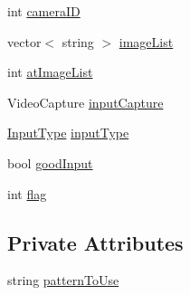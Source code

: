 \begin{DoxyCompactItemize}
\item 
int \hyperlink{classSettings_af32a5ff06192bde106c934e0361bcd7e}{camera\-I\-D}
\item 
vector$<$ string $>$ \hyperlink{classSettings_ae261128a69d1d3d2b0f5315aff8066c8}{image\-List}
\item 
int \hyperlink{classSettings_a80061aedf354e63cb6c4c1fb7c4a9055}{at\-Image\-List}
\item 
Video\-Capture \hyperlink{classSettings_abd5706146b34d3c32aef4025dcd2ec1b}{input\-Capture}
\item 
\hyperlink{classSettings_a5afe85d24b071973a7f248c05386f7f4}{Input\-Type} \hyperlink{classSettings_a89fb14ce9856fb642f18bb0f7c5b8868}{input\-Type}
\item 
bool \hyperlink{classSettings_a3b9fc27b555f982bd5b9ea5198e1f7e3}{good\-Input}
\item 
int \hyperlink{classSettings_aba5691e3e76525f93ea254e654ec3717}{flag}
\end{DoxyCompactItemize}
\subsection*{Private Attributes}
\begin{DoxyCompactItemize}
\item 
string \hyperlink{classSettings_ae8df4a531058c0dc6b544aff531e55ef}{pattern\-To\-Use}
\end{DoxyCompactItemize}


